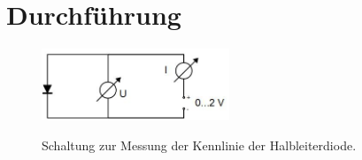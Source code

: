 \section{Durchführung} 

\begin{figure}[h]
	\centering
		\includegraphics[width=0.5\textwidth]{Abbildungen/Schaltung_Kennlinie.jpg}
	\label{fig:Schaltung_Kennlinie}
	\caption{Schaltung zur Messung der Kennlinie der Halbleiterdiode.}
\end{figure}

